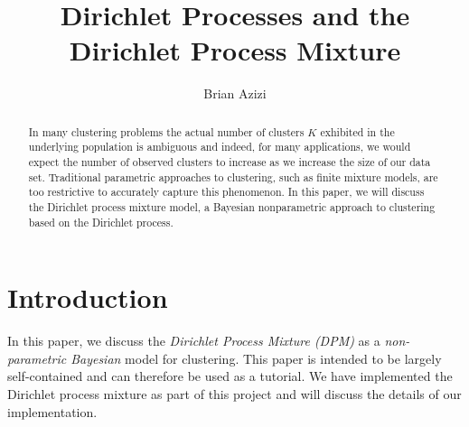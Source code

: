 \documentclass[final,3p,times,twocolumn]{elsarticle}
\begin{document}
\begin{frontmatter}



\title{Dirichlet Processes and the Dirichlet Process Mixture}


\author{Brian Azizi}

\address{Cavendish Laboratory, Department of Physics, J J Thomson
  Avenue, Cambridge. CB3 0HE}

\begin{abstract}
In many clustering problems the actual number of clusters $K$ exhibited in the underlying population is ambiguous and indeed, for many applications, we would expect the number of observed clusters to increase as we increase the size of our data set.
Traditional parametric approaches to clustering, such as finite mixture models, are too restrictive to accurately capture this phenomenon.
In this paper, we will discuss the Dirichlet process mixture model, a Bayesian nonparametric approach to clustering based on the Dirichlet process.
\end{abstract}

\end{frontmatter}


\section{Introduction}
\label{sect:Intro}
In this paper, we discuss the \emph{Dirichlet Process Mixture (DPM)} as a \emph{non-parametric Bayesian} model for clustering.
This paper is intended to be largely self-contained and can therefore be used as a tutorial.
We have implemented the Dirichlet process mixture as part of this project and will discuss the details of our implementation.
\end{document}
